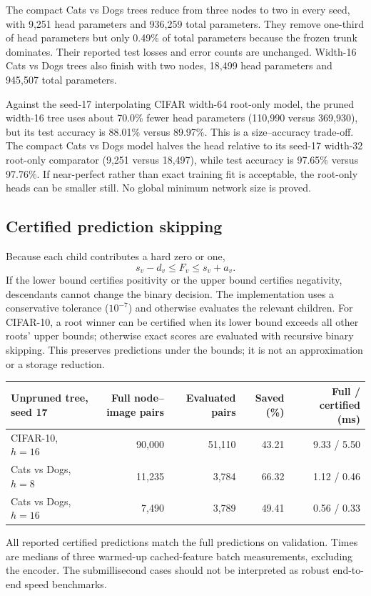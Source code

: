 \documentclass[11pt,a4paper]{article}
\begin{document}
The compact Cats vs Dogs trees reduce from three nodes to two in every seed, with 9,251 head parameters and 936,259 total parameters. They remove one-third of head parameters but only 0.49\% of total parameters because the frozen trunk dominates. Their reported test losses and error counts are unchanged. Width-16 Cats vs Dogs trees also finish with two nodes, 18,499 head parameters and 945,507 total parameters.

Against the seed-17 interpolating CIFAR width-64 root-only model, the pruned width-16 tree uses about 70.0\% fewer head parameters (110,990 versus 369,930), but its test accuracy is 88.01\% versus 89.97\%. This is a size--accuracy trade-off. The compact Cats vs Dogs model halves the head relative to its seed-17 width-32 root-only comparator (9,251 versus 18,497), while test accuracy is 97.65\% versus 97.76\%. If near-perfect rather than exact training fit is acceptable, the root-only heads can be smaller still. No global minimum network size is proved.

\subsection{Certified prediction skipping}
Because each child contributes a hard zero or one,
\begin{equation}
 s_v-d_v\leq F_v\leq s_v+a_v.
\end{equation}
If the lower bound certifies positivity or the upper bound certifies negativity, descendants cannot change the binary decision. The implementation uses a conservative tolerance ($10^{-7}$) and otherwise evaluates the relevant children. For CIFAR-10, a root winner can be certified when its lower bound exceeds all other roots' upper bounds; otherwise exact scores are evaluated with recursive binary skipping. This preserves predictions under the bounds; it is not an approximation or a storage reduction.

\begin{center}\small
\begin{tabular}{lrrrr}\toprule
Unpruned tree, seed 17 & Full node--image pairs & Evaluated pairs & Saved (\%) & Full / certified (ms)\\\midrule
CIFAR-10, $h=16$ & 90,000 & 51,110 & 43.21 & 9.33 / 5.50\\
Cats vs Dogs, $h=8$ & 11,235 & 3,784 & 66.32 & 1.12 / 0.46\\
Cats vs Dogs, $h=16$ & 7,490 & 3,789 & 49.41 & 0.56 / 0.33\\\bottomrule
\end{tabular}\end{center}
All reported certified predictions match the full predictions on validation. Times are medians of three warmed-up cached-feature batch measurements, excluding the encoder. The submillisecond cases should not be interpreted as robust end-to-end speed benchmarks.
\end{document}
